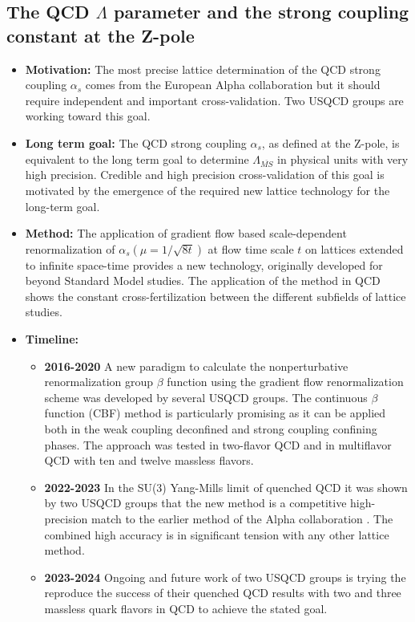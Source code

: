 \documentclass[12pt,hyperpdf]{article}
\begin{document}
\subsection{The QCD $\Lambda$ parameter and the  strong coupling constant at the Z-pole}
\begin{itemize}
	\item{\bf Motivation:}  The most precise lattice determination of
          the QCD strong coupling $\alpha_s$  comes from the European
          Alpha collaboration but  it should require independent and
          important  cross-validation. Two  USQCD  groups are working
          toward  this goal. 
	\item{\bf Long term goal:} The QCD strong coupling $\alpha_s$, as
          defined at the Z-pole, is equivalent to the long term goal
          to determine $\Lambda_{\overline{MS}}$  in physical units
          with very high precision. Credible and high precision
          cross-validation  of this goal  is motivated by the
          emergence of  the required new lattice  technology for the
          long-term goal. 
	\item{\bf Method:}  The application of gradient flow based
          scale-dependent renormalization of
          $\alpha_s(\mu=1/\sqrt{8t})$ at flow time scale $t$ on
          lattices extended to  infinite space-time provides a new
          technology, originally developed for beyond Standard Model studies. The application of the method in QCD shows the constant cross-fertilization  between the different subfields  of lattice studies. 
	\item{\bf Timeline:}
\begin{itemize}
	\item{\bf 2016-2020} A new paradigm to calculate the nonperturbative renormalization group $\beta$ function using the gradient flow renormalization scheme was developed by several USQCD groups. The continuous $\beta$ function (CBF) method is particularly promising as it can be applied both in the weak coupling deconfined and strong coupling confining phases. The  approach was
          tested in two-flavor QCD and in multiflavor QCD
          with ten and twelve massless flavors. 
	\item{\bf 2022-2023} In the SU(3) Yang-Mills limit of quenched QCD
          it was shown by two USQCD groups that the new method is a
          competitive high-precision match to the earlier method of
          the Alpha collaboration
          \cite{Hasenfratz:2023bok,Wong:2023jvr}. The combined high
          accuracy is in significant tension with any other lattice
          method. 
	\item{\bf 2023-2024}  Ongoing and future work of two USQCD groups
          is trying the reproduce the success of their quenched QCD
          results with two and three massless quark flavors in QCD to achieve
          the stated  goal.  
\end{itemize}
\end{itemize}
\end{document}
